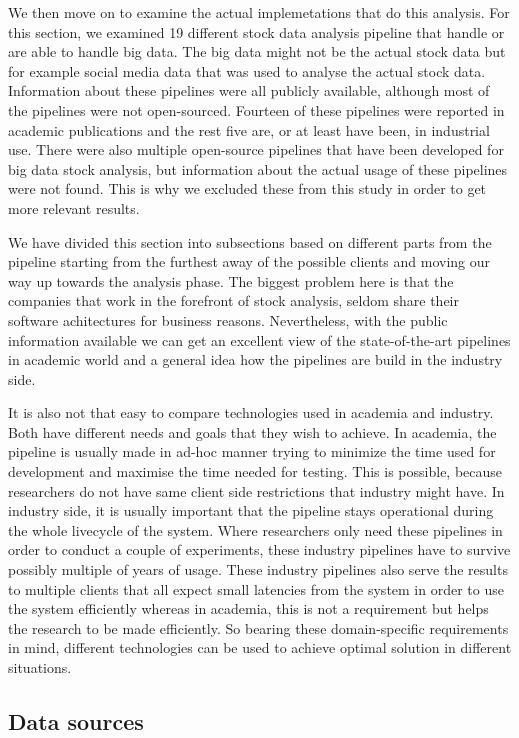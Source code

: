 We then move on to examine the actual implemetations that do this analysis.
For this section, we examined 19 different stock data analysis pipeline that handle or are able to handle big data.
The big data might not be the actual stock data but for example social media data that was used to analyse the actual stock data.
Information about these pipelines were all publicly available, although most of the pipelines were not open-sourced.
Fourteen of these pipelines were reported in academic publications and the rest five are, or at least have been, in industrial use.
There were also multiple open-source pipelines that have been developed for big data stock analysis, but information about the actual usage of these pipelines were not found.
This is why we excluded these from this study in order to get more relevant results.

We have divided this section into subsections based on different parts from the pipeline starting from the furthest away of the possible clients and moving our way up towards the analysis phase.
The biggest problem here is that the companies that work in the forefront of stock analysis, seldom share their software achitectures for business reasons.
Nevertheless, with the public information available we can get an excellent view of the state-of-the-art pipelines in academic world and a general idea how the pipelines are build in the industry side.

It is also not that easy to compare technologies used in academia and industry.
Both have different needs and goals that they wish to achieve.
In academia, the pipeline is usually made in ad-hoc manner trying to minimize the time used for development and maximise the time needed for testing.
This is possible, because researchers do not have same client side restrictions that industry might have.
In industry side, it is usually important that the pipeline stays operational during the whole livecycle of the system.
Where researchers only need these pipelines in order to conduct a couple of experiments, these industry pipelines have to survive possibly multiple of years of usage.
These industry pipelines also serve the results to multiple clients that all expect small latencies from the system in order to use the system efficiently whereas in academia, this is not a requirement but helps the research to be made efficiently.
So bearing these domain-specific requirements in mind, different technologies can be used to achieve optimal solution in different situations.

\subsection{Data sources}

